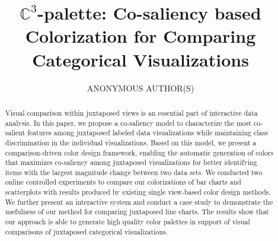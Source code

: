 \documentclass[manuscript,review,anonymous]{acmart}
\newcommand{\toolname}{$\mathbb{C}^3$}
\begin{document}
\graphicspath{{figures/}{pictures/}{images/}{./}} %
\title{\toolname-palette: Co-saliency based Colorization for Comparing Categorical Visualizations}
%
%
\author{ANONYMOUS AUTHOR(S)}
\renewcommand{\shortauthors}{Anon.}

\begin{abstract}
Visual comparison within juxtaposed views is an essential part of interactive data analysis. In this paper, we propose a co-saliency model to characterize the most co-salient features among juxtaposed labeled data visualizations while maintaining class discrimination in the individual visualizations.
Based on this model, we present a comparison-driven color design framework, enabling the automatic  generation of colors that maximizes co-saliency among juxtaposed visualizations for better identifying  items with the largest magnitude change between two data sets. We conducted two online controlled experiments to compare our colorizations of bar charts and scatterplots with results produced by existing single view-based color design methods. We further present an interactive system and conduct a case study to demonstrate the usefulness of our method for comparing juxtaposed line charts. The results show that our approach is able to generate high quality color palettes in support of visual comparisons of juxtaposed categorical visualizations.
\end{abstract}
\end{document}
